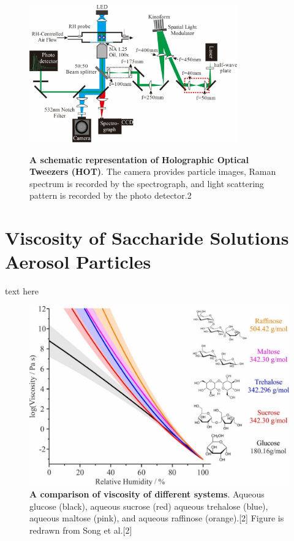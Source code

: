 \begin{figure}
    \centering
    \caption{\textbf{A schematic representation of Holographic Optical Tweezers (HOT)}. The camera provides particle images, Raman spectrum is recorded by the spectrograph, and light scattering pattern is recorded by the photo detector.2}
    \includegraphics[width=0.8\textwidth]{chapters/water_hopping/figures/image011.jpg}
    \label{fig:wat_s5}
\end{figure}

\section{Viscosity of Saccharide Solutions Aerosol Particles}

text here

\begin{figure}
    \centering
    \includegraphics{chapters/water_hopping/figures/image014.jpg}
    \caption{\textbf{A comparison of viscosity of different systems}. Aqueous glucose (black), aqueous sucrose (red) aqueous trehalose (blue), aqueous maltose (pink), and aqueous raffinose (orange).[2] Figure is redrawn from Song et al.[2]}
    \label{fig:wat_s6}
\end{figure}

